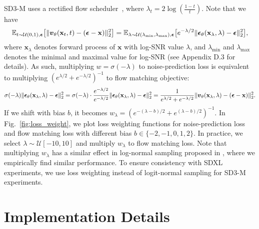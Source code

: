 SD3-M uses a rectified flow scheduler~\citep{lipman2022flow}, where $\lambda_t = 2 \log (\tfrac{1-t}{t})$. Note that we have 
\begin{equation}
\mathbb{E}_{t\sim\mathcal{U}(0,1),\boldsymbol{\epsilon}}\big[\|\boldsymbol{v}_\theta(\mathbf{x}_t,t) - (\boldsymbol{\epsilon} - \mathbf{x})\|_2^2\big] = \mathbb{E}_{\lambda\sim \mathcal{U}(\lambda_{\textrm{min}}, \lambda_{\textrm{max}}), \boldsymbol{\epsilon}}\big[e^{-\lambda/2}\|\boldsymbol{\epsilon}_\theta(\mathbf{x}_\lambda,\lambda) - \boldsymbol{\epsilon}\|_2^2\big]\text{,}
\end{equation}
where $\mathbf{x}_\lambda$ denotes forward process of $\mathbf{x}$ with log-SNR value $\lambda$, and $\lambda_{\textrm{min}}$ and $\lambda_{\textrm{max}}$ denotes the minimal and maximal value for log-SNR (see \citep{kingma2023understanding} Appendix D.3 for details).
As such, multiplying $w = \sigma(-\lambda)$ to noise-prediction loss is equivalent to multiplying $(e^{\lambda/2} + e^{-\lambda / 2})^{-1}$ to flow matching objective:
\begin{equation}
    \sigma(-\lambda)\|\boldsymbol{\epsilon}_\theta(\mathbf{x}_\lambda,\lambda) - \boldsymbol{\epsilon}\|_2^2 = \sigma(-\lambda)\cdot \frac{e^{-\lambda / 2}}{e^{-\lambda / 2}}\|\boldsymbol{\epsilon}_\theta(\mathbf{x}_\lambda,\lambda) - \boldsymbol{\epsilon}\|_2^2 = \frac{1}{e^{\lambda / 2} + e^{-\lambda / 2}}\|\boldsymbol{v}_\theta(\mathbf{x}_\lambda, \lambda) - (\boldsymbol{\epsilon} - \mathbf{x})\|_2^2\text{.} 
\end{equation}
If we shift with bias $b$, it becomes $w_\lambda = (e^{-(\lambda -b)/2} + e^{(\lambda -b)/2})^{-1}$.
In Fig.~\ref{fig:loss_weight}, we plot loss weighting functions for noise-prediction loss and flow matching loss with different bias $b\in\{-2, -1, 0, 1, 2\}$.
In practice, we select $\lambda \sim \mathcal{U}[-10, 10]$ and multiply $w_\lambda$ to flow matching loss.
Note that multiplying $w_\lambda$ has a similar effect in log-normal sampling proposed in \citep{karras2022elucidating, esser2024scaling}, where we empirically find similar performance. To ensure consistency with SDXL experiments, we use loss weighting instead of logit-normal sampling for SD3-M experiments.


\section{Implementation Details}
